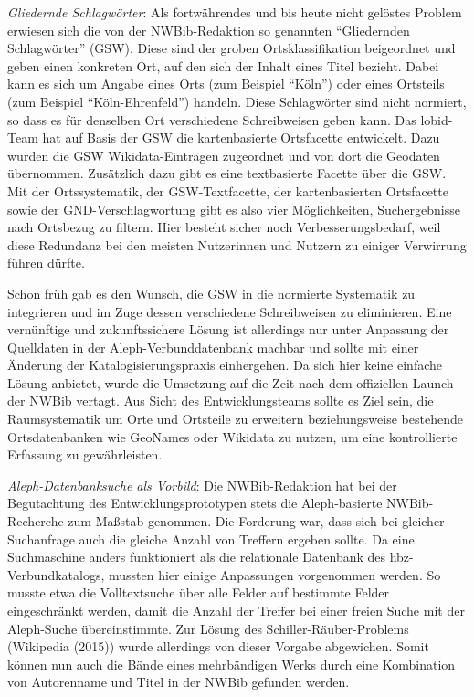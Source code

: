 \documentclass[a4paper,
fontsize=11pt,
oneside,
numbers=noperiodatend,
parskip=half-,
bibliography=totoc,
final
]{scrartcl}
\begin{document}
\emph{Gliedernde Schlagwörter}: Als fortwährendes und bis heute nicht
gelöstes Problem erwiesen sich die von der NWBib-Redaktion so genannten
\enquote{Gliedernden Schlagwörter} (GSW). Diese sind der groben
Ortsklassifikation beigeordnet und geben einen konkreten Ort, auf den
sich der Inhalt eines Titel bezieht. Dabei kann es sich um Angabe eines
Orts (zum Beispiel \enquote{Köln}) oder eines Ortsteils (zum Beispiel
\enquote{Köln-Ehrenfeld}) handeln. Diese Schlagwörter sind nicht
normiert, so dass es für denselben Ort verschiedene Schreibweisen geben
kann. Das lobid-Team hat auf Basis der GSW die kartenbasierte
Ortsfacette entwickelt. Dazu wurden die GSW Wikidata-Einträgen
zugeordnet und von dort die Geodaten übernommen. Zusätzlich dazu gibt es
eine textbasierte Facette über die GSW. Mit der Ortssystematik, der
GSW-Textfacette, der kartenbasierten Ortsfacette sowie der
GND-Verschlagwortung gibt es also vier Möglichkeiten, Suchergebnisse
nach Ortsbezug zu filtern. Hier besteht sicher noch Verbesserungsbedarf,
weil diese Redundanz bei den meisten Nutzerinnen und Nutzern zu einiger
Verwirrung führen dürfte.

Schon früh gab es den Wunsch, die GSW in die normierte Systematik zu
integrieren und im Zuge dessen verschiedene Schreibweisen zu
eliminieren. Eine vernünftige und zukunftssichere Lösung ist allerdings
nur unter Anpassung der Quelldaten in der Aleph-Verbunddatenbank machbar
und sollte mit einer Änderung der Katalogisierungspraxis einhergehen. Da
sich hier keine einfache Lösung anbietet, wurde die Umsetzung auf die
Zeit nach dem offiziellen Launch der NWBib vertagt. Aus Sicht des
Entwicklungsteams sollte es Ziel sein, die Raumsystematik um Orte und
Ortsteile zu erweitern beziehungsweise bestehende Ortsdatenbanken wie
GeoNames oder Wikidata zu nutzen, um eine kontrollierte Erfassung zu
gewährleisten.

\emph{Aleph-Datenbanksuche als Vorbild}: Die NWBib-Redaktion hat bei der
Begutachtung des Entwicklungsprototypen stets die Aleph-basierte
NWBib-Recherche zum Maßstab genommen. Die Forderung war, dass sich bei
gleicher Suchanfrage auch die gleiche Anzahl von Treffern ergeben
sollte. Da eine Suchmaschine anders funktioniert als die relationale
Datenbank des hbz-Verbundkatalogs, mussten hier einige Anpassungen
vorgenommen werden. So musste etwa die Volltextsuche über alle Felder
auf bestimmte Felder eingeschränkt werden, damit die Anzahl der Treffer
bei einer freien Suche mit der Aleph-Suche übereinstimmte. Zur Lösung
des Schiller-Räuber-Problems (Wikipedia (2015)) wurde allerdings von
dieser Vorgabe abgewichen. Somit können nun auch die Bände eines
mehrbändigen Werks durch eine Kombination von Autorenname und Titel in
der NWBib gefunden werden.
\end{document}
